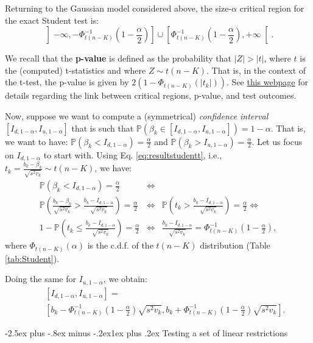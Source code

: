 \documentclass[
  11pt,
]{book}
\makeatletter
\renewcommand\subsection{\@startsection{subsection}{2}{\z@}
  {-2.5ex plus -.8ex minus -.2ex}{1ex plus .2ex}
  {\normalfont\large\bfseries\color{TextbookInk}}}
\theoremstyle{definition}
\theoremstyle{definition}
\theoremstyle{definition}
\theoremstyle{definition}
\theoremstyle{remark}
\makeatother
\begin{document}
Returning to the Gaussian model considered above, the size-\(\alpha\) critical region for the exact Student test is:
\[
\left]-\infty,-\Phi^{-1}_{t(n-K)}\left(1-\frac{\alpha}{2}\right)\right] \cup \left[\Phi^{-1}_{t(n-K)}\left(1-\frac{\alpha}{2}\right),+\infty\right[.
\]

We recall that the \textbf{p-value} is defined as the probability that \(|Z| > |t|\), where \(t\) is the (computed) t-statistics and where \(Z \sim t(n-K)\). That is, in the context of the t-test, the p-value is given by \(2(1 - \Phi_{t(n-K)}(|t_k|))\). See \href{https://jrenne.shinyapps.io/tests/}{this webpage} for details regarding the link between critical regions, p-value, and test outcomes.

Now, suppose we want to compute a (symmetrical) \emph{confidence interval} \([I_{d,1-\alpha},I_{u,1-\alpha}]\) that is such that \(\mathbb{P}(\beta_k \in [I_{d,1-\alpha},I_{u,1-\alpha}])=1-\alpha\). That is, we want to have: \(\mathbb{P}(\beta_k < I_{d,1-\alpha})=\frac{\alpha}{2}\) and \(\mathbb{P}(\beta_k > I_{u,1-\alpha})=\frac{\alpha}{2}\). Let us focus on \(I_{d,1-\alpha}\) to start with. Using Eq. \eqref{eq:resultstudentt}, i.e., \(t_k = \frac{b_k - \beta_k}{\sqrt{s^2v_k}} \sim t(n-K)\), we have:
\begin{eqnarray*}
\mathbb{P}(\beta_k < I_{d,1-\alpha})=\frac{\alpha}{2} &\Leftrightarrow& \\
\mathbb{P}\left(\frac{b_k - \beta_k}{\sqrt{s^2v_k}} > \frac{b_k - I_{d,1-\alpha}}{\sqrt{s^2v_k}}\right)=\frac{\alpha}{2} &\Leftrightarrow& \mathbb{P}\left(t_k > \frac{b_k - I_{d,1-\alpha}}{\sqrt{s^2v_k}}\right)=\frac{\alpha}{2} \Leftrightarrow\\
1 - \mathbb{P}\left(t_k \le \frac{b_k - I_{d,1-\alpha}}{\sqrt{s^2v_k}}\right)=\frac{\alpha}{2} &\Leftrightarrow& \frac{b_k - I_{d,1-\alpha}}{\sqrt{s^2v_k}} = \Phi^{-1}_{t(n-K)}\left(1-\frac{\alpha}{2}\right),
\end{eqnarray*}
where \(\Phi_{t(n-K)}(\alpha)\) is the c.d.f. of the \(t(n-K)\) distribution (Table \ref{tab:Student}).

Doing the same for \(I_{u,1-\alpha}\), we obtain:
\begin{eqnarray*}
&&[I_{d,1-\alpha},I_{u,1-\alpha}] =\\
&&\left[b_k - \Phi^{-1}_{t(n-K)}\left(1-\frac{\alpha}{2}\right)\sqrt{s^2v_k},b_k + \Phi^{-1}_{t(n-K)}\left(1-\frac{\alpha}{2}\right)\sqrt{s^2v_k}\right].
\end{eqnarray*}

\subsection{Testing a set of linear restrictions}\label{Ftest}
\end{document}
